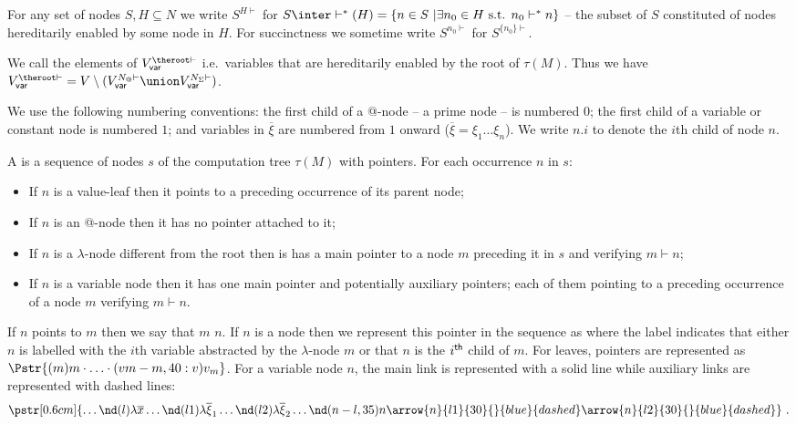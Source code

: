 For any set of nodes $S, H \subseteq N$ we write $S^{H\vdash}$ for $S \inter \vdash^*(H) = \{ n \in S \ | \exists n_0 \in H \mbox{ s.t. }n_0  \vdash^* n \}$ -- the subset of $S$ constituted of nodes hereditarily enabled by some node in $H$. For succinctness we sometime write $S^{n_0\vdash}$ for
$S^{\{n_0\}\vdash}$.

We call  the elements of $V_{\sf var}^{\theroot\vdash}$ i.e.\
variables that are hereditarily enabled by the root of $\tau(M)$. Thus we have
$V_{\sf var}^{\theroot\vdash} = V \setminus ( V_{\sf var}^{N_@\vdash}
\union V_{\sf var}^{N_\Sigma\vdash})$.
\smallskip

We use the following numbering conventions:
the first child of a @-node -- a prime node -- is numbered $0$;
the first child of a variable or constant node is numbered $1$;
and variables in $\overline{\xi}$ are numbered from $1$ onward ($\overline{\xi} = \xi_1 \ldots \xi_n$).
We write $n.i$ to denote the $i$th child of node $n$.

\begin{definition}
\label{dfn:justseqnode} A  is a
sequence of nodes $s$ of the computation tree $\tau(M)$ with
pointers. For each occurrence $n$ in $s$:
\begin{itemize}
  \item If $n$ is a value-leaf then it points to a preceding occurrence of its parent node;
  \item If $n$ is an @-node then it has no pointer attached to it;
  \item If $n$ is a $\lambda$-node different from the root
  then is has a main pointer to a node $m$ preceding it in $s$ and verifying $m \vdash n$;
  \item If $n$ is a variable node then it has one main pointer and
  potentially auxiliary pointers; each of them pointing to a
  preceding occurrence of a node $m$ verifying $m \vdash n$.
\end{itemize}

If $n$ points to $m$ then we say that $m$  $n$.
If $n$ is a node then we represent this pointer in the sequence as \Pstr[0.4cm]{
(m){m} \ldots (n-m,45:i) n } where the label indicates that either
$n$ is labelled with the $i$th variable abstracted by the
$\lambda$-node $m$ or that $n$ is the $i^{\sf th}$ child of $m$.
For leaves, pointers are represented as
$\Pstr{ (m){m} \cdot \ldots \cdot (vm-m,40:v){v_m} }$.
For a variable node $n$, the main link is represented with a solid
line while auxiliary links are represented with dashed lines:
$$\pstr[0.6cm]{ \ldots
    \nd(l){\lambda \overline{x}}  \ldots
    \nd(l1){\lambda \overline{\xi}_1} \ldots
    \nd(l2){\lambda \overline{\xi}_2 } \ldots
    \nd(n-l,35){n}
    \arrow{n}{l1}{30}{}{blue}{dashed}
    \arrow{n}{l2}{30}{}{blue}{dashed}
} \ .$$
\end{definition}

